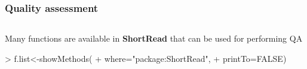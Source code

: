 \documentclass{beamer}
\begin{document}
\begin{frame}[fragile]
\frametitle{Quality assessment}
\begin{columns}
\begin{column}{0.3\textwidth}
  \bit
      \item Many functions are available in \textbf{ShortRead} that can be used for performing QA
      \begin{uncoverenv}
\begin{Schunk}
\begin{Sinput}
> f.list<-showMethods(
+ where="package:ShortRead",
+ printTo=FALSE)
\end{Sinput}
\end{Schunk}
       \end{uncoverenv}   
       \vspace{8cm}
  \eit
  \end{column}
  

\end{columns}
\end{frame}
\end{document}

